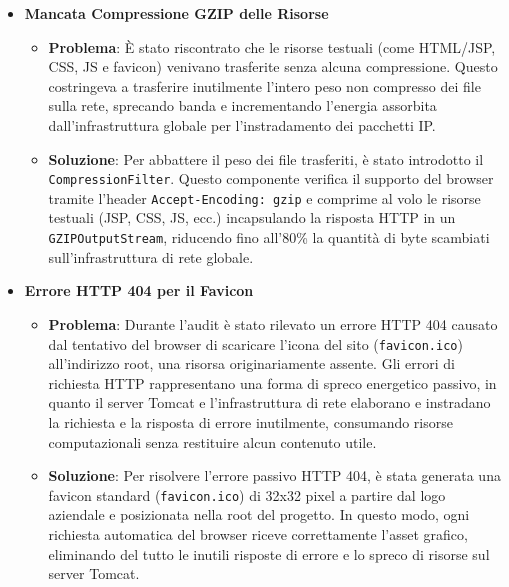 \begin{itemize}
\begin{itemize}
        \item \textbf{Soluzione}: Per ovviare alla mancanza di direttive di caching, è stato sviluppato un filtro servlet globale (\texttt{CachingFilter}) che intercetta le richieste dirette alle risorse statiche e inietta l'intestazione HTTP \texttt{Cache-Control: public, max-age=31536000, immutable} (insieme all'header \texttt{Expires}). Questa stessa logica è stata estesa anche al gestore di file dinamici \texttt{FileServlet}, assicurando che, dopo il primo download, il browser legga sempre gli asset dalla cache locale a costo energetico e di rete nullo.
    \end{itemize}
    \item \textbf{Mancata Compressione GZIP delle Risorse}
    \begin{itemize}
        \item \textbf{Problema}: È stato riscontrato che le risorse testuali (come HTML/JSP, CSS, JS e favicon) venivano trasferite senza alcuna compressione. Questo costringeva a trasferire inutilmente l'intero peso non compresso dei file sulla rete, sprecando banda e incrementando l'energia assorbita dall'infrastruttura globale per l'instradamento dei pacchetti IP.
        \item \textbf{Soluzione}: Per abbattere il peso dei file trasferiti, è stato introdotto il \texttt{CompressionFilter}. Questo componente verifica il supporto del browser tramite l'header \texttt{Accept-Encoding: gzip} e comprime al volo le risorse testuali (JSP, CSS, JS, ecc.) incapsulando la risposta HTTP in un \texttt{GZIPOutputStream}, riducendo fino all'80\% la quantità di byte scambiati sull'infrastruttura di rete globale.
    \end{itemize}
    \item \textbf{Errore HTTP 404 per il Favicon}
    \begin{itemize}
        \item \textbf{Problema}: Durante l'audit è stato rilevato un errore HTTP 404 causato dal tentativo del browser di scaricare l'icona del sito (\texttt{favicon.ico}) all'indirizzo root, una risorsa originariamente assente. Gli errori di richiesta HTTP rappresentano una forma di spreco energetico passivo, in quanto il server Tomcat e l'infrastruttura di rete elaborano e instradano la richiesta e la risposta di errore inutilmente, consumando risorse computazionali senza restituire alcun contenuto utile.
        \item \textbf{Soluzione}: Per risolvere l'errore passivo HTTP 404, è stata generata una favicon standard (\texttt{favicon.ico}) di 32x32 pixel a partire dal logo aziendale e posizionata nella root del progetto. In questo modo, ogni richiesta automatica del browser riceve correttamente l'asset grafico, eliminando del tutto le inutili risposte di errore e lo spreco di risorse sul server Tomcat.

\end{itemize}
\end{itemize}
